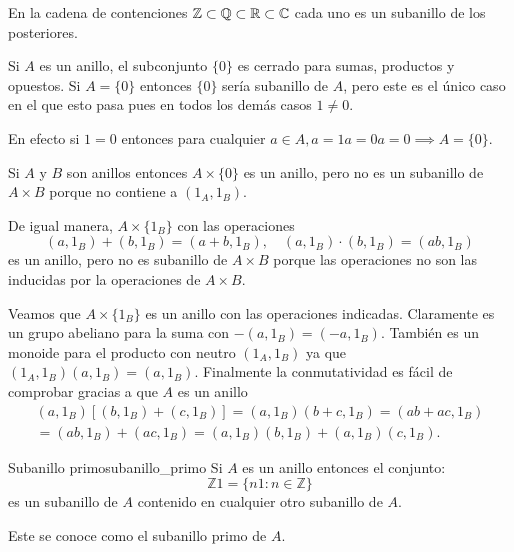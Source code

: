 \begin{example}{}{}
    En la cadena de contenciones $\mathbb{Z} \subset \mathbb{Q} \subset \mathbb{R} \subset \mathbb{C}$ cada uno es un subanillo de los posteriores.
\end{example}

\begin{example}{}{}
    Si $A$ es un anillo, el subconjunto $\{0\}$ es cerrado para sumas, productos y opuestos. Si $A = \{0\}$ entonces $\{0\}$ sería subanillo de $A$, pero este es el único caso en el que esto pasa pues en todos los demás casos $1 \neq 0$.

    En efecto si $1=0$ entonces para cualquier $a \in A, a = 1a = 0a = 0 \implies A = \{0\}$.
\end{example}

\begin{example}{}{}
    Si $A$ y $B$ son anillos entonces $A \times \{0\}$ es un anillo, pero no es un subanillo de $A \times B$ porque no contiene a $(1_A, 1_B)$.

    De igual manera, $A \times \{1_B\}$ con las operaciones
    \[
    (a,1_B) + (b, 1_B) = (a+b, 1_B), \quad (a,1_B )\cdot (b, 1_B) = (ab, 1_B)
    \]
    es un anillo, pero no es subanillo de $A \times B$ porque las operaciones no son las inducidas por la operaciones de $A \times B$.
\end{example}

\begin{proofbox}
    Veamos que $A \times \{1_B\}$ es un anillo con las operaciones indicadas. Claramente es un grupo abeliano para la suma con $-(a,1_B) = (-a, 1_B)$. También es un monoide para el producto con neutro $(1_A, 1_B)$ ya que $(1_A, 1_B) (a, 1_B) = (a, 1_B)$. Finalmente la conmutatividad es fácil de comprobar gracias a que $A$ es un anillo
    \begin{align*}
        (a, 1_B)[(b, 1_B) + (c, 1_B)] = (a, 1_B)(b+c, 1_B) = (ab + ac, 1_B) \\
        = (ab, 1_B) + (ac, 1_B) = (a, 1_B)(b, 1_B) + (a, 1_B)(c, 1_B).
    \end{align*}
\end{proofbox}

\begin{example}{Subanillo primo}{subanillo_primo}
    Si \(A\) es un anillo entonces el conjunto:
    \[
    \mathbb{Z}1 = \{n1 : n \in \mathbb{Z}\}
    \]
    es un subanillo de \(A\) contenido en cualquier otro subanillo de \(A\). 
    
    Este se conoce como el subanillo primo de \(A\). 
\end{example}

